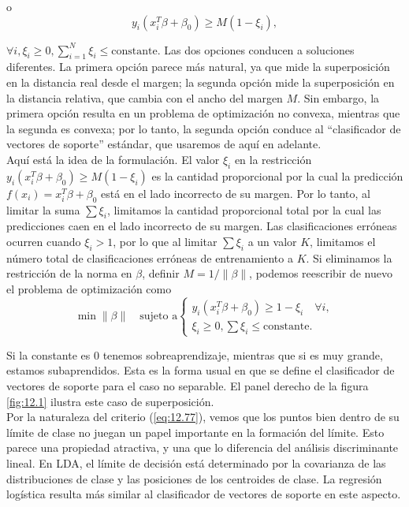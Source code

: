 \noindent o
\begin{equation}
y_i (x_i^T \beta + \beta_0) \geq M (1 - \xi_i),
\end{equation}

$\forall i, \xi_i \geq 0, \sum_{i=1}^N \xi_i \leq \text{constante}$. Las dos opciones conducen a soluciones diferentes. La primera opción parece más natural, ya que mide la superposición en la distancia real desde el margen; la segunda opción mide la superposición en la distancia relativa, que cambia con el ancho del margen $M$. Sin embargo, la primera opción resulta en un problema de optimización no convexa, mientras que la segunda es convexa; por lo tanto, la segunda opción conduce al ``clasificador de vectores de soporte'' estándar, que usaremos de aquí en adelante. \\

Aquí está la idea de la formulación. El valor $\xi_i$ en la restricción $y_i (x_i^T \beta + \beta_0) \geq M (1 - \xi_i)$ es la cantidad proporcional por la cual la predicción $f(x_i) = x_i^T \beta + \beta_0$ está en el lado incorrecto de su margen. Por lo tanto, al limitar la suma $\sum \xi_i$, limitamos la cantidad proporcional total por la cual las predicciones caen en el lado incorrecto de su margen. Las clasificaciones erróneas ocurren cuando $\xi_i > 1$, por lo que al limitar $\sum \xi_i$ a un valor $K$, limitamos el número total de clasificaciones erróneas de entrenamiento a $K$.
Si eliminamos la restricción de la norma en $\beta$, definir $M = 1/\|\beta\|$, podemos reescribir de nuevo el problema de optimización como 
\begin{equation}
\min \|\beta\| \quad \text{sujeto a}
\begin{cases}
y_i (x_i^T \beta + \beta_0) \geq 1 - \xi_i \quad \forall i, \\
\xi_i \geq 0, \sum \xi_i \leq \text{constante}.
\end{cases}
\label{eq:12.77}
\end{equation}

Si la constante es 0 tenemos sobreaprendizaje, mientras que si es muy grande, estamos subaprendidos. Esta es la forma usual en que se define el clasificador de vectores de soporte para el caso no separable. El panel derecho de la figura \ref{fig:12.1} ilustra este caso de superposición. \\

Por la naturaleza del criterio (\ref{eq:12.77}), vemos que los puntos bien dentro de su límite de clase no juegan un papel importante en la formación del límite. Esto parece una propiedad atractiva, y una que lo diferencia del análisis discriminante lineal. En LDA, el límite de decisión está determinado por la covarianza de las distribuciones de clase y las posiciones de los centroides de clase. La regresión logística resulta más similar al clasificador de vectores de soporte en este aspecto.

